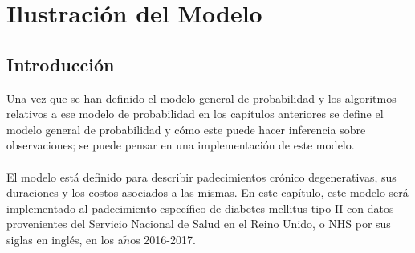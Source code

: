 \chapter{Ilustraci\'on del Modelo}
\section{Introducci\'on}
Una vez que se han definido el modelo general de probabilidad y los algoritmos relativos a ese modelo de probabilidad en los cap\'itulos anteriores se define el modelo general de probabilidad y c\'omo este puede hacer inferencia sobre observaciones; se puede pensar en una implementaci\'on de este modelo.\\
\\
El modelo est\'a definido para describir padecimientos cr\'onico degenerativas, sus duraciones y los costos asociados a las mismas. En este cap\'itulo, este modelo ser\'a implementado al padecimiento espec\'ifico de diabetes mellitus tipo II con datos provenientes del Servicio Nacional de Salud en el Reino Unido, o NHS por sus siglas en ingl\'es, en los a$\tilde{n}$os 2016-2017.\\

